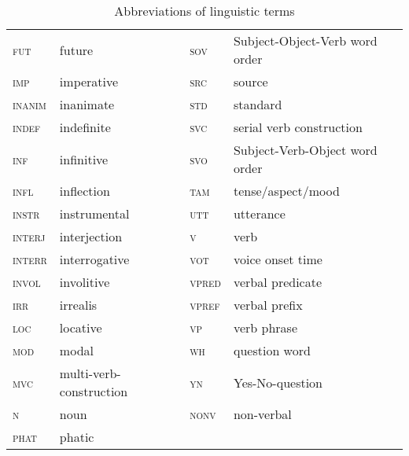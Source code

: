 \begin{table}[h]
\begin{tabular}{ll|ll}
 \textsc{fut} 	& future & \textsc{sov} 	& Subject-Object-Verb word order \\
 \textsc{imp} 	& imperative & \textsc{src} 	& source \\
 \textsc{inanim} 	& inanimate & \textsc{std} 	& standard \\
 \textsc{indef} 	& indefinite & \textsc{svc} 	& serial verb construction \\
 \textsc{inf} 	& infinitive & \textsc{svo} 	& Subject-Verb-Object word order \\
 \textsc{infl} 	& inflection & \textsc{tam} 	& tense/aspect/mood \\
 \textsc{instr} 	& instrumental & \textsc{utt} 	& utterance \\
 \textsc{interj} 	& interjection & \textsc{v} 	& verb \\
 \textsc{interr} 	& interrogative & \textsc{vot} 	& voice onset time \\
 \textsc{invol} 	& involitive & \textsc{vpred} 	& verbal predicate \\
 \textsc{irr} 	& irrealis & \textsc{vpref} 	& verbal prefix \\
 \textsc{loc} 	& locative & \textsc{vp} 	& verb phrase \\
 \textsc{mod} 	& modal & \textsc{wh} 	& question word \\
 \textsc{mvc} 	& multi-verb-construction & \textsc{yn} 	& Yes-No-question \\
 \textsc{n} 	& noun & \textsc{nonv} & non-verbal\\
\textsc{phat}& phatic& \\
 		\end{tabular}
 	\caption{Abbreviations of linguistic terms} 
 \end{table}
 
 